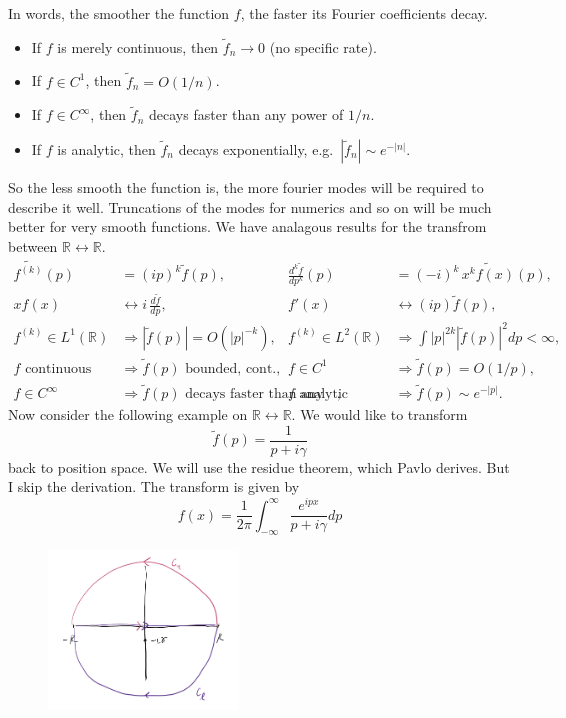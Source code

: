 \documentclass[11pt,a4paper]{article}
\begin{document}
In words, the smoother the function $f$, the faster its Fourier coefficients decay.  
\begin{itemize}
	\item If $f$ is merely continuous, then $\tilde{f}_{n} \to 0$ (no specific rate).  
	\item If $f \in C^{1}$, then $\tilde{f}_{n} = O(1/n)$.  
	\item If $f \in C^{\infty}$, then $\tilde{f}_{n}$ decays faster than any power of $1/n$.  
	\item If $f$ is analytic, then $\tilde{f}_{n}$ decays exponentially, e.g.\ $|\tilde{f}_{n}| \sim e^{-|n|}$.  
\end{itemize}
So the less smooth the function is, the more fourier modes will be required to describe it well. Truncations of the modes for numerics and so on will be much better for very smooth functions. We have analagous results for the transfrom between $\mathbb{R}\leftrightarrow\mathbb{R}$. 
\begin{align*}
	\widetilde{f^{(k)}}(p) &= (ip)^{k}\tilde{f}(p), &
	\frac{d^{k}\tilde{f}}{dp^{k}}(p) &= (-i)^{k}\,\widetilde{x^{k}f(x)}(p), \\[4pt]
	x f(x) &\leftrightarrow i\,\frac{d\tilde{f}}{dp}, &
	f'(x) &\leftrightarrow (ip)\tilde{f}(p), \\[4pt]
	f^{(k)}\in L^{1}(\mathbb{R}) &\Rightarrow |\tilde{f}(p)|=O(|p|^{-k}), &
	f^{(k)}\in L^{2}(\mathbb{R}) &\Rightarrow \int |p|^{2k}|\tilde{f}(p)|^{2}dp<\infty, \\[4pt]
	f\text{ continuous} &\Rightarrow \tilde{f}(p)\text{ bounded, cont.}, &
	f\in C^{1} &\Rightarrow \tilde{f}(p)=O(1/p), \\[4pt]
	f\in C^{\infty} &\Rightarrow \tilde{f}(p)\text{ decays faster than any power}, &
	f\text{ analytic} &\Rightarrow \tilde{f}(p)\sim e^{-|p|}.
\end{align*}
Now consider the following example on $\mathbb{R}\leftrightarrow\mathbb{R}$.  We would like to transform
$$
\tilde{f}(p) = \frac{1}{p+i\gamma}
$$
back to position space. We will use the residue theorem, which Pavlo derives. But I skip the derivation. The transform is given by
$$
f(x) = \frac{1}{2\pi}\int_{-\infty}^{\infty}\frac{e^{ipx}}{p+i\gamma}dp
$$
\begin{figure}[H]
	\centering
	\includegraphics[width=0.45\textwidth]{contour4.png} %
\end{figure}
\end{document}
